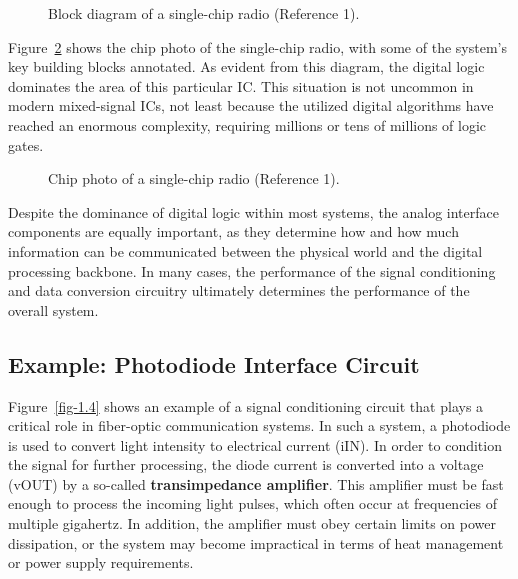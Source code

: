 \documentclass[
  11pt,
  letterpaper,
  abstract]{scrbook}
\begin{document}
\begin{figure}


\caption{\label{fig-1.2}Block diagram of a single-chip radio (Reference
1).}

\end{figure}%

Figure~\ref{fig-1.3} shows the chip photo of the single-chip radio, with
some of the system's key building blocks annotated. As evident from this
diagram, the digital logic dominates the area of this particular IC.
This situation is not uncommon in modern mixed-signal ICs, not least
because the utilized digital algorithms have reached an enormous
complexity, requiring millions or tens of millions of logic gates.

\begin{figure}


\caption{\label{fig-1.3}Chip photo of a single-chip radio (Reference
1).}

\end{figure}%

Despite the dominance of digital logic within most systems, the analog
interface components are equally important, as they determine how and
how much information can be communicated between the physical world and
the digital processing backbone. In many cases, the performance of the
signal conditioning and data conversion circuitry ultimately determines
the performance of the overall system.

\subsection{Example: Photodiode Interface
Circuit}\label{example-photodiode-interface-circuit}

Figure~\ref{fig-1.4} shows an example of a signal conditioning circuit
that plays a critical role in fiber-optic communication systems. In such
a system, a photodiode is used to convert light intensity to electrical
current (iIN). In order to condition the signal for further processing,
the diode current is converted into a voltage (vOUT) by a so-called
\textbf{transimpedance amplifier}. This amplifier must be fast enough to
process the incoming light pulses, which often occur at frequencies of
multiple gigahertz. In addition, the amplifier must obey certain limits
on power dissipation, or the system may become impractical in terms of
heat management or power supply requirements.
\end{document}
